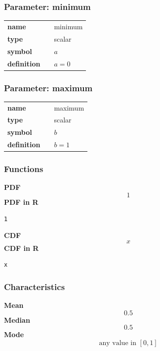 \subsubsection*{Parameter: minimum}

\noindent\begin{tabular}{p{2cm}cl}
\textbf{name} & & minimum \\
\textbf{type} & & scalar \\
\textbf{symbol} & & $a$  \\
\textbf{definition} & & $a=0$
\end{tabular}
\subsubsection*{Parameter: maximum}

\noindent\begin{tabular}{p{2cm}cl}
\textbf{name} & & maximum \\
\textbf{type} & & scalar \\
\textbf{symbol} & & $b$  \\
\textbf{definition} & & $b=1$
\end{tabular}
\subsubsection*{Functions}

\smallskip \noindent \hspace{.2cm} \textbf{PDF} 
\begin{equation*}1\end{equation*}
\smallskip \noindent \hspace{.2cm} \textbf{PDF in R}  
\begin{verbatim}1\end{verbatim}
\smallskip \noindent \hspace{.2cm} \textbf{CDF} 
\begin{equation*}x\end{equation*}
\smallskip \noindent \hspace{.2cm} \textbf{CDF in R} 
\begin{verbatim}x\end{verbatim}
\smallskip
\subsubsection*{Characteristics}
\smallskip \noindent \hspace{.2cm} \textbf{Mean} 
\begin{equation*}0.5\end{equation*}
\smallskip \noindent \hspace{.2cm} \textbf{Median} 
\begin{equation*}0.5\end{equation*}
\smallskip \noindent \hspace{.2cm} \textbf{Mode} 
\begin{equation*}\text{any value in }[0,1]\end{equation*}
\smallskip
